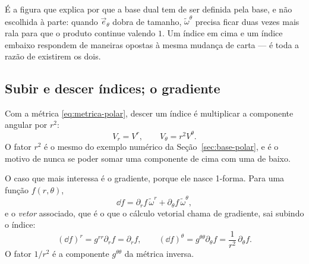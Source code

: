 \documentclass[12pt,a4paper,oneside]{book}
\theoremstyle{rgplain}
\theoremstyle{rgremark}
\begin{document}
\begin{central}
É a figura que explica por que a base dual tem de ser definida pela base, e
não escolhida à parte: quando $\vec e_\theta$ dobra de tamanho,
$\tilde\omega^\theta$ precisa ficar duas vezes mais rala para que o produto
continue valendo $1$. Um índice em cima e um índice embaixo respondem de
maneiras opostas à mesma mudança de carta --- é toda a razão de existirem os
dois.
\end{central}

\subsection*{Subir e descer índices; o gradiente}

Com a métrica \eqref{eq:metrica-polar}, descer um índice é multiplicar a
componente angular por $r^2$:
\begin{equation}
  V_r=V^r,\qquad V_\theta=r^2V^\theta .
  \label{eq:sobe-desce-polar}
\end{equation}
O fator $r^2$ é o mesmo do exemplo numérico da Seção~\ref{sec:base-polar}, e é
o motivo de nunca se poder somar uma componente de cima com uma de baixo.

O caso que mais interessa é o gradiente, porque ele nasce 1-forma. Para uma
função $f(r,\theta)$,
\begin{equation}
  \dd f=\partial_rf\,\tilde\omega^r+\partial_\theta f\,\tilde\omega^\theta ,
  \label{eq:gradiente-1forma}
\end{equation}
e o \emph{vetor} associado, que é o que o cálculo vetorial chama de gradiente,
sai subindo o índice:
\begin{equation}
  (\dd f)^r=g^{rr}\partial_rf=\partial_rf,
  \qquad
  (\dd f)^\theta=g^{\theta\theta}\partial_\theta f
  =\frac{1}{r^2}\,\partial_\theta f .
  \label{eq:gradiente-vetor}
\end{equation}
O fator $1/r^2$ é a componente $g^{\theta\theta}$ da métrica inversa.
\end{document}
